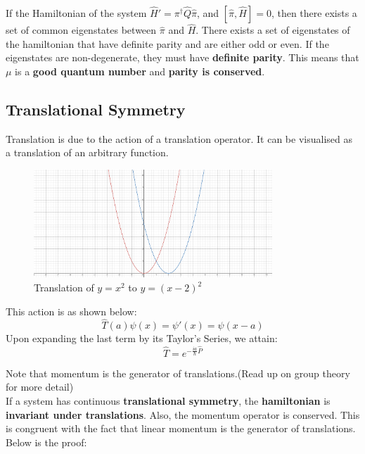 \documentclass{article}
\begin{document}
\begin{flushleft}
If the Hamiltonian of the system $\hat{H}'=\pi^\dagger\hat{Q}\hat{\pi}$, and $[\hat{\pi},\hat{H}]=0$, then there exists a set of common eigenstates between $\hat{\pi}$ and $\hat{H}$. There exists a set of eigenstates of the hamiltonian that have definite parity and are either odd or even. If the eigenstates are non-degenerate, they must have \textbf{definite parity}. This means that $\mu$ is a\textbf{ good quantum number} and \textbf{parity is conserved}.
\pagebreak
\subsection{Translational Symmetry}

Translation is due to the action of a translation operator. It can be visualised as a translation of an arbitrary function.

\begin{figure}[h]
    \centering
    \includegraphics[width=0.8\textwidth]{Capture 1.png}
    \caption{Translation of $y=x^2$ to $y=(x-2)^2$}
    \label{fig:my_label}
    \end{figure}

This action is as shown below:
$$\hat{T}(a)\psi(x)=\psi'(x)=\psi(x-a)$$
Upon expanding the last term by its Taylor's Series, we attain:
$$\hat{T}=e^{-\frac{ia}{\hbar}{\hat{P}}}$$

Note that momentum is the generator of translations.(Read up on group theory for more detail)\\[0.5cm]

If a system has continuous \textbf{translational symmetry}, the \textbf{hamiltonian} is \textbf{invariant under translations}. Also, the momentum operator is conserved. This is congruent with the fact that linear momentum is the generator of translations. Below is the proof:


\end{flushleft}
\end{document}
